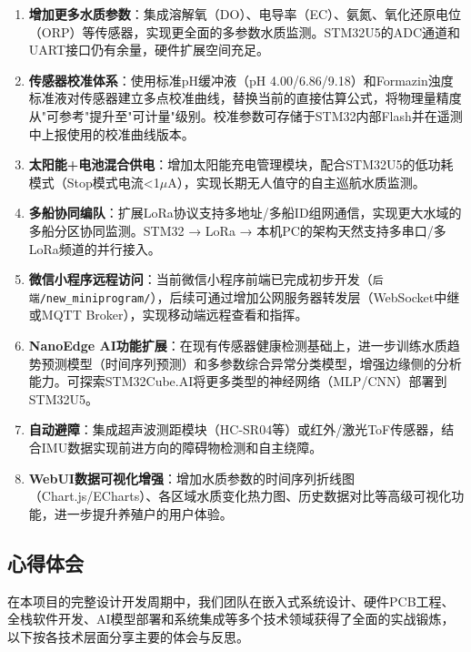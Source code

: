 \documentclass[12pt,a4paper]{ctexart}
\begin{document}
\begin{enumerate}[label=\arabic*.]
    \item \textbf{增加更多水质参数}：集成溶解氧（DO）、电导率（EC）、氨氮、氧化还原电位（ORP）等传感器，实现更全面的多参数水质监测。STM32U5的ADC通道和UART接口仍有余量，硬件扩展空间充足。

    \item \textbf{传感器校准体系}：使用标准pH缓冲液（pH 4.00/6.86/9.18）和Formazin浊度标准液对传感器建立多点校准曲线，替换当前的直接估算公式，将物理量精度从"可参考"提升至"可计量"级别。校准参数可存储于STM32内部Flash并在遥测中上报使用的校准曲线版本。

    \item \textbf{太阳能+电池混合供电}：增加太阳能充电管理模块，配合STM32U5的低功耗模式（Stop模式电流<1$\mu$A），实现长期无人值守的自主巡航水质监测。

    \item \textbf{多船协同编队}：扩展LoRa协议支持多地址/多船ID组网通信，实现更大水域的多船分区协同监测。STM32 → LoRa → 本机PC的架构天然支持多串口/多LoRa频道的并行接入。

    \item \textbf{微信小程序远程访问}：当前微信小程序前端已完成初步开发（\texttt{后端/new\_miniprogram/}），后续可通过增加公网服务器转发层（WebSocket中继或MQTT Broker），实现移动端远程查看和指挥。

    \item \textbf{NanoEdge AI功能扩展}：在现有传感器健康检测基础上，进一步训练水质趋势预测模型（时间序列预测）和多参数综合异常分类模型，增强边缘侧的分析能力。可探索STM32Cube.AI将更多类型的神经网络（MLP/CNN）部署到STM32U5。

    \item \textbf{自动避障}：集成超声波测距模块（HC-SR04等）或红外/激光ToF传感器，结合IMU数据实现前进方向的障碍物检测和自主绕障。

    \item \textbf{WebUI数据可视化增强}：增加水质参数的时间序列折线图（Chart.js/ECharts）、各区域水质变化热力图、历史数据对比等高级可视化功能，进一步提升养殖户的用户体验。
\end{enumerate}

\subsection{心得体会}

在本项目的完整设计开发周期中，我们团队在嵌入式系统设计、硬件PCB工程、全栈软件开发、AI模型部署和系统集成等多个技术领域获得了全面的实战锻炼，以下按各技术层面分享主要的体会与反思。
\end{document}
